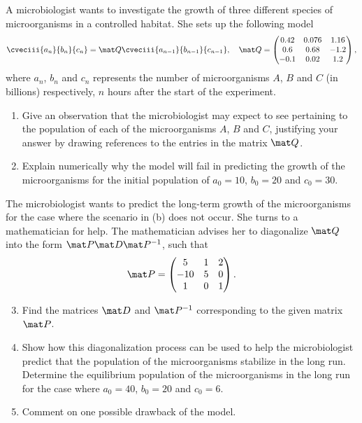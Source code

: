 \begin{problem}
    A microbiologist wants to investigate the growth of three different species of microorganisms in a controlled habitat. She sets up the following model \[\cveciii{a_n}{b_n}{c_n} = \mat Q\cveciii{a_{n-1}}{b_{n-1}}{c_{n-1}}, \quad \mat Q = \begin{pmatrix}0.42 & 0.076 & 1.16 \\ 0.6 & 0.68 & -1.2 \\ -0.1 & 0.02 & 1.2\end{pmatrix},\] where $a_n$, $b_n$ and $c_n$ represents the number of microorganisms $A$, $B$ and $C$ (in billions) respectively, $n$ hours after the start of the experiment.

    \begin{enumerate}
        \item Give an observation that the microbiologist may expect to see pertaining to the population of each of the microorganisms $A$, $B$ and $C$, justifying your answer by drawing references to the entries in the matrix $\mat Q$.
        \item Explain numerically why the model will fail in predicting the growth of the microorganisms for the initial population of $a_0 = 10$, $b_0 = 20$ and $c_0 = 30$.
    \end{enumerate}

    The microbiologist wants to predict the long-term growth of the microorganisms for the case where the scenario in (b) does not occur. She turns to a mathematician for help. The mathematician advises her to diagonalize $\mat Q$ into the form $\mat P \mat D \mat P^{-1}$, such that \[\mat P = \begin{pmatrix}5 & 1 & 2 \\ -10 & 5 & 0 \\ 1 & 0 & 1\end{pmatrix}.\]

    \begin{enumerate}
        \setcounter{enumi}{2}
        \item Find the matrices $\mat D$ and $\mat P^{-1}$ corresponding to the given matrix $\mat P$.
        \item Show how this diagonalization process can be used to help the microbiologist predict that the population of the microorganisms stabilize in the long run. Determine the equilibrium population of the microorganisms in the long run for the case where $a_0 = 40$, $b_0 = 20$ and $c_0 = 6$.
        \item Comment on one possible drawback of the model.
    \end{enumerate}
\end{problem}